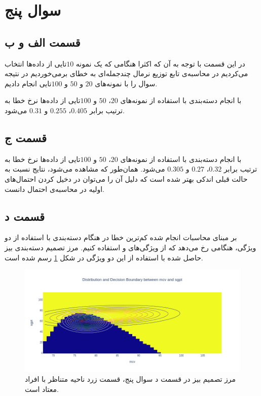 \documentclass{article}
\begin{document}
\section*{سوال پنج}

\subsection*{قسمت الف و ب}

در این قسمت با توجه به آن که اکثرا هنگامی که یک نمونه $10$تایی از داده‌ها انتخاب می‌کردیم در محاسبه‌ی
تابع توزیع نرمال چندجمله‌ای به خطای  برمی‌خوردیم در نتیجه سوال را با نمونه‌های
$20$ و $50$ و $100$تایی انجام دادیم.

با انجام دسته‌بندی با استفاده از نمونه‌های $20$، $50$ و $100$تایی از داده‌ها نرخ خطا به ترتیب برابر
$0.405$، $0.255$ و $0.31$ می‌شود.

\subsection*{قسمت ج}

با انجام دسته‌بندی با استفاده از نمونه‌های $20$، $50$ و $100$تایی از داده‌ها نرخ خطا به ترتیب برابر
$0.32$، $0.27$ و $0.305$ می‌شود. همان‌طور که مشاهده می‌شود، نتایج نسبت به حالت قبلی اندکی بهتر شده است که دلیل آن را می‌توان
در دخیل کردن احتمال‌های اولیه در محاسبه‌ی احتمال دانست.

\subsection*{قسمت د}

بر مبنای محاسبات انجام شده کم‌ترین خطا در هنگام دسته‌بندی با استفاده از دو ویژگی، هنگامی رخ می‌دهد که
از ویژگی‌های  و  استفاده کنیم. مرز تصمیم دسته‌بندی بیز حاصل شده با استفاده از این دو ویژگی در
شکل \ref{bayes-decision-boundary} رسم شده است.

\begin{figure}[h]
    \centering
    \includegraphics[scale=0.3]{images/q5/bayes_decision.png}
    \caption{مرز تصمیم بیز در قسمت د سوال پنج، قسمت زرد ناحیه متناظر با افراد معتاد است.}
    \label{bayes-decision-boundary}
\end{figure}
\end{document}
